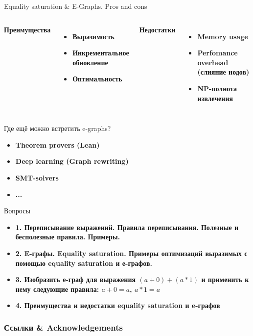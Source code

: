 \documentclass[aspectratio=169
  , xcolor={svgnames}
  , russian  %
  ]{beamer}
\begin{document}
\begin{frame}{Equality saturation \& E-Graphs. Pros and cons}
    \begin{columns}
        \textbf{Преимущества}
        \begin{itemize}
            \item \textbf{Выразимость}
            \item \textbf{Инкрементальное обновление}
            \item \textbf{Оптимальность}
        \end{itemize}

        \textbf{Недостатки}
        \begin{itemize}
            \item \textbf{Memory usage}
            \item \textbf{Perfomance overhead (слияние нодов)}
            \item \textbf{NP-полнота извлечения}
        \end{itemize}
    \end{columns}
\end{frame}

\begin{frame}{Где ещё можно встретить e-graphs?}
    \begin{itemize}
    \item \textbf{\fontsize{14.1}{12} Theorem provers (Lean) \cite{Lean}}
    \newline
    \item \textbf{\fontsize{14.1}{12} Deep learning (Graph rewriting)\cite{Deep_learning}}
    \newline
    \item \textbf{\fontsize{14.1}{12} SMT-solvers\cite{CMT} }
    \newline
    \item \textbf{\fontsize{14.1}{12} ... }
    \end{itemize}
\end{frame}

\begin{frame}{Вопросы}
    \begin{itemize}
    \item \textbf{\fontsize{14.1}{12} 1. Переписывание выражений. Правила переписывания. Полезные и бесполезные правила. Примеры. }
    \newline
    \item \textbf{\fontsize{14.1}{12}
2. E-графы. Equality saturation. Примеры оптимизаций выразимых с помощью equality saturation и е-графов.}
    \newline
    \item \textbf{\fontsize{14.1}{12} 3. Изобразить е-граф для выражения $(a + 0) + (a * 1)$ и применить к нему следующие правила: $a + 0 = a$, $a * 1 = a$ }
    \newline
    \item \textbf{\fontsize{14.1}{12} 4. Преимущества и недостатки equality saturation и e-графов
 }
    \end{itemize}
\end{frame}

\begin{frame}%
\frametitle<presentation>{Ссылки \& Acknowledgements}
\vspace{-1em}
\printbibliography
\end{frame}
\end{document}
